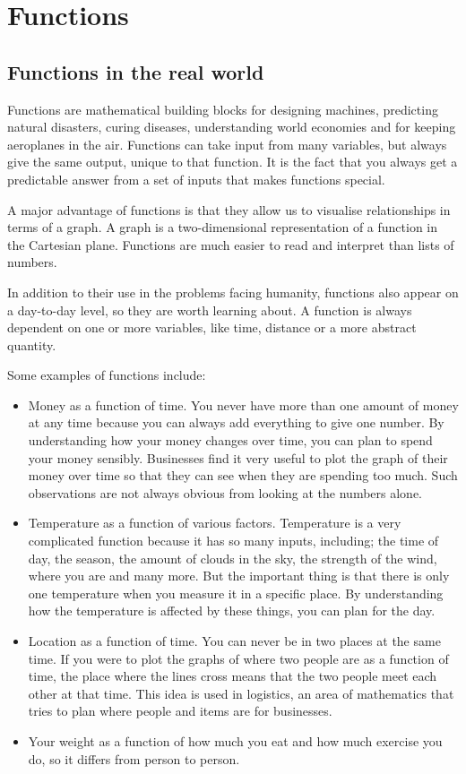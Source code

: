 
\chapter{Functions}
\setcounter{figure}{0}
\setcounter{subfigure}{0}

\section{Functions in the real world}
Functions are mathematical building blocks for designing machines, predicting natural disasters, curing diseases, understanding world economies and for keeping aeroplanes in the air. Functions can take input from many variables, but always give the same output, unique to that function. It is the fact that you always get a predictable answer from a set of inputs that makes functions special.\par 
A major advantage of functions is that they allow us to visualise relationships in terms of a graph. A graph is a two-dimensional representation of a function in the Cartesian plane. Functions are much easier to read and interpret than lists of numbers.\par 
In addition to their use in the problems facing humanity, functions also appear on a day-to-day level, so they are worth learning about. A function is always dependent on one or more variables, like time, distance or a more abstract quantity.\par 

Some examples of functions include:\par 
\begin{itemize}[noitemsep]
\item Money as a function of time. You never have more than one amount of money at any time because you can always add everything to give one number. By understanding how your money changes over time, you can plan to spend your money sensibly. Businesses find it very useful to plot the graph of their money over time so that they can see when they are spending too much. Such observations are not always obvious from looking at the numbers alone.
\item Temperature as a function of various factors. Temperature is a very complicated function because it has so many inputs, including; the time of day, the season, the amount of clouds in the sky, the strength of the wind, where you are and many more. But the important thing is that there is only one temperature when you measure it in a specific place. By understanding how the temperature is affected by these things, you can plan
for the day.
\item Location as a function of time. You can never be in two places at the same time. If you were to plot the graphs of where two people are as a function of time, the place where the lines cross means that the two people meet each other at that time. This idea is used in logistics, an area of mathematics that tries to plan where people and items are for businesses.
\item Your weight as a function of how much you eat and how much exercise you do, so it differs from person to person.
\end{itemize}

